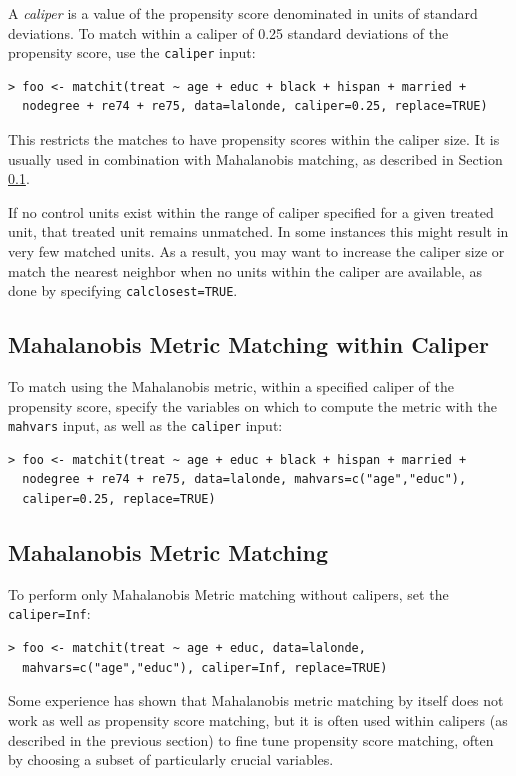 \documentclass[oneside,letterpaper,titlepage]{article}
\begin{document}
A \emph{caliper} is a value of the propensity score denominated in
units of standard deviations.  To match within a caliper of 0.25
standard deviations of the propensity score, use the \texttt{caliper}
input:

\begin{verbatim}
> foo <- matchit(treat ~ age + educ + black + hispan + married +
  nodegree + re74 + re75, data=lalonde, caliper=0.25, replace=TRUE)
\end{verbatim}

This restricts the matches to have propensity scores within the
caliper size.  It is usually used in combination with Mahalanobis
matching, as described in Section \ref{mahal}.

If no control units exist within the range of caliper specified for
a given treated unit, that
treated unit remains unmatched.  In some instances this might result
in very few matched units.  As a result, you may want to increase the
caliper size or match the nearest neighbor when no units within
the caliper are available, as done by specifying
\texttt{calclosest=TRUE}.

\subsection{Mahalanobis Metric Matching within Caliper}
\label{mahal}
To match using the Mahalanobis metric, within a specified caliper of
the propensity score, specify the variables on which to compute the
metric with the \texttt{mahvars} input, as well as the
\texttt{caliper} input:

\begin{verbatim}
> foo <- matchit(treat ~ age + educ + black + hispan + married +
  nodegree + re74 + re75, data=lalonde, mahvars=c("age","educ"),
  caliper=0.25, replace=TRUE)
\end{verbatim}

\subsection{Mahalanobis Metric Matching}

To perform only Mahalanobis Metric matching without calipers, set the
\texttt{caliper=Inf}:

\begin{verbatim}
> foo <- matchit(treat ~ age + educ, data=lalonde,
  mahvars=c("age","educ"), caliper=Inf, replace=TRUE)
\end{verbatim}
Some experience has shown that Mahalanobis metric matching by itself
does not work as well as propensity score matching, but it is often
used within calipers (as described in the previous section) to fine
tune propensity score matching, often by choosing a subset of
particularly crucial variables.
\end{document}
